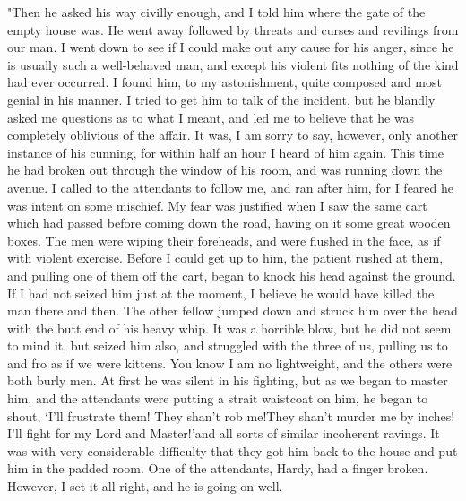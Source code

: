 "Then he asked his way civilly enough, and I told him where the gate of the empty house was. He went away followed by threats and curses and revilings from our man. I went down to see if I could make out any cause for his anger, since he is usually such a well-behaved man, and except his violent fits nothing of the kind had ever occurred. I found him, to my astonishment, quite composed and most genial in his manner. I tried to get him to talk of the incident, but he blandly asked me questions as to what I meant, and led me to believe that he was completely oblivious of the affair. It was, I am sorry to say, however, only another instance of his cunning, for within half an hour I heard of him again. This time he had broken out through the window of his room, and was running down the avenue. I called to the attendants to follow me, and ran after him, for I feared he was intent on some mischief. My fear was justified when I saw the same cart which had passed before coming down the road, having on it some great wooden boxes. The men were wiping their foreheads, and were flushed in the face, as if with violent exercise. Before I could get up to him, the patient rushed at them, and pulling one of them off the cart, began to knock his head against the ground. If I had not seized him just at the moment, I believe he would have killed the man there and then. The other fellow jumped down and struck him over the head with the butt end of his heavy whip. It was a horrible blow, but he did not seem to mind it, but seized him also, and struggled with the three of us, pulling us to and fro as if we were kittens. You know I am no lightweight, and the others were both burly men. At first he was silent in his fighting, but as we began to master him, and the attendants were putting a strait waistcoat on him, he began to shout, `I'll frustrate them! They shan't rob me!They shan't murder me by inches! I'll fight for my Lord and Master!'and all sorts of similar incoherent ravings. It was with very considerable difficulty that they got him back to the house and put him in the padded room. One of the attendants, Hardy, had a finger broken. However, I set it all right, and he is going on well. 

